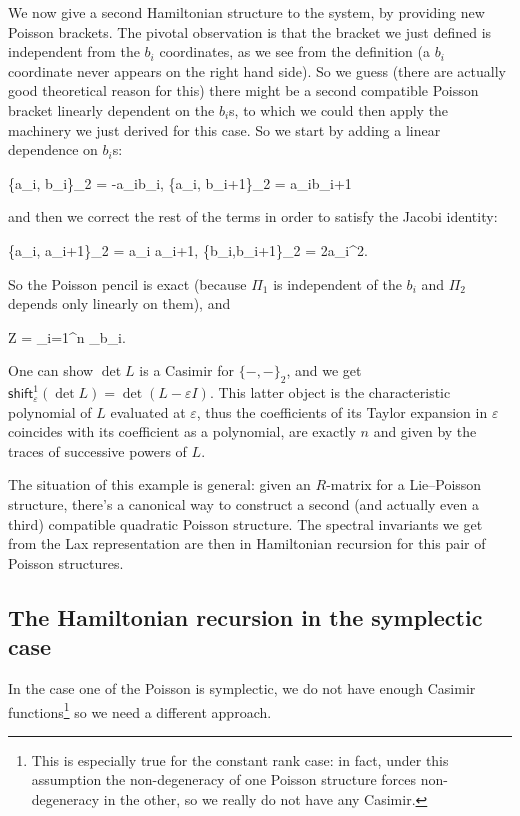 \documentclass[main.tex]{subfiles}
\begin{document}
\begin{example}
	We now give a second Hamiltonian structure to the system, by providing new Poisson brackets. The pivotal observation is that the bracket we just defined is independent from the $b_i$ coordinates, as we see from the definition (a $b_i$ coordinate never appears on the right hand side). So we guess (there are actually good theoretical reason for this) there might be a second compatible Poisson bracket linearly dependent on the $b_i$s, to which we could then apply the machinery we just derived for this case. So we start by adding a linear dependence on $b_i$s:
	\begin{eqalign}
		\{a_i, b_i\}_2 = -a_ib_i, \quad \{a_i, b_{i+1}\}_2 = a_ib_{i+1}
	\end{eqalign}
	and then we correct the rest of the terms in order to satisfy the Jacobi identity:
	\begin{eqalign}
		\{a_i, a_{i+1}\}_2 =  a_i a_{i+1}, \quad \{b_i,b_{i+1}\}_2 = 2a_i^2.
	\end{eqalign}
	So the Poisson pencil is exact (because $\Pi_1$ is independent of the $b_i$ and $\Pi_2$ depends only linearly on them), and
	\begin{eqalign}
		Z = \sum_{i=1}^n \partial_{b_i}.
	\end{eqalign}
	One can show $\det L$ is a Casimir for $\{-,-\}_2$, and we get $\mathsf{shift}^1_\varepsilon(\det L)= \det (L-\varepsilon I)$. This latter object is the characteristic polynomial of $L$ evaluated at $\varepsilon$, thus the coefficients of its Taylor expansion in $\varepsilon$ coincides with its coefficient as a polynomial, are exactly $n$ and given by the traces of successive powers of $L$.
\end{example}

The situation of this example is general: given an $R$-matrix for a Lie--Poisson structure, there's a canonical way to construct a second (and actually even a third) compatible quadratic Poisson structure. The spectral invariants we get from the Lax representation are then in Hamiltonian recursion for this pair of Poisson structures.

\subsection{The Hamiltonian recursion in the symplectic case}
In the case one of the Poisson is symplectic, we do not have enough Casimir functions\footnote{This is especially true for the constant rank case: in fact, under this assumption the non-degeneracy of one Poisson structure forces non-degeneracy in the other, so we really do not have any Casimir.} so we need a different approach.
\end{document}
